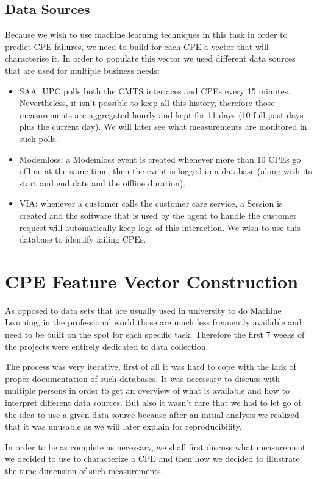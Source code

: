 \section{Data Sources}
\label{subsec:data-source} 
Because we wish to use machine learning techniques in this task in order to predict CPE failures, we need to build for each CPE a vector that will characterise it. In order to populate this vector we used different data sources that are used for multiple business needs:
\begin{itemize}
    \item SAA: UPC polls both the CMTS interfaces and CPEs every 15 minutes. Nevertheless, it isn't possible to keep all this history, therefore those measurements are aggregated hourly and kept for 11 days (10 full past days plus the current day). We will later see what measurements are monitored in such polls. 
    \item Modemloss: a Modemloss event is created whenever more than 10 CPEs go offline at the same time, then the event is logged in a database (along with its start and end date and the offline duration).
    \item VIA: whenever a customer calls the customer care service, a Session is created and the software that is used by the agent to handle the customer request will automatically keep logs of this interaction. We wish to use this database to identify failing CPEs.
\end{itemize}


\chapter{CPE Feature Vector Construction}
As opposed to data sets that are usually used in university to do Machine Learning, in the professional world those are much less frequently available and need to be built on the spot for each specific task. Therefore the first 7 weeks of the projects were entirely dedicated to data collection. 

The process was very iterative, first of all it was hard to cope with the lack of proper documentation of such databases. It was necessary to discuss with multiple persons in order to get an overview of what is available and how to interpret different data sources. But also it wasn't rare that we had to let go of the idea to use a given data source because after an initial analysis we realized that it was unusable as we will later explain for reproducibility.

In order to be as complete as necessary, we shall first discuss what measurement we decided to use to characterize a CPE and then how we decided to illustrate the time dimension of such measurements.

